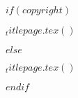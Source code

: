 $if(copyright)$
  \begin{frontmatter}
  \begin{titlepage}
  $_titlepage.tex()$
  \end{titlepage}
  \end{frontmatter}

$else$
  \begin{frontmatter}
  \begin{titlepage}
  $_titlepage.tex()$
  \end{titlepage}
  \end{frontmatter}

$endif$

\tableofcontents
{\let\newpage\relax}

\RaggedRight